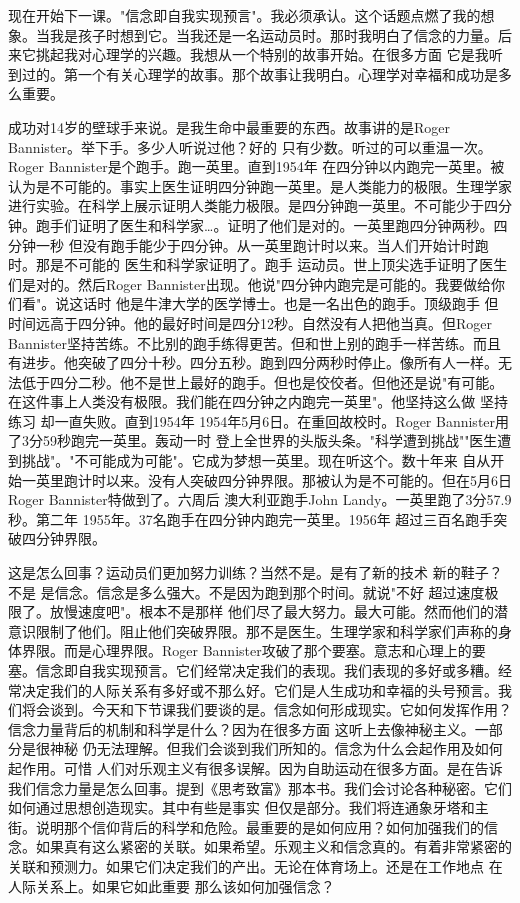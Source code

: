 现在开始下一课。"信念即自我实现预言"。我必须承认。这个话题点燃了我的想象。当我是孩子时想到它。当我还是一名运动员时。那时我明白了信念的力量。后来它挑起我对心理学的兴趣。我想从一个特别的故事开始。在很多方面 它是我听到过的。第一个有关心理学的故事。那个故事让我明白。心理学对幸福和成功是多么重要。 

成功对14岁的壁球手来说。是我生命中最重要的东西。故事讲的是Roger Bannister。举下手。多少人听说过他？好的 只有少数。听过的可以重温一次。Roger Bannister是个跑手。跑一英里。直到1954年 在四分钟以内跑完一英里。被认为是不可能的。事实上医生证明四分钟跑一英里。是人类能力的极限。生理学家进行实验。在科学上展示证明人类能力极限。是四分钟跑一英里。不可能少于四分钟。跑手们证明了医生和科学家…。证明了他们是对的。一英里跑四分钟两秒。四分钟一秒 但没有跑手能少于四分钟。从一英里跑计时以来。当人们开始计时跑时。那是不可能的 医生和科学家证明了。跑手 运动员。世上顶尖选手证明了医生们是对的。然后Roger Bannister出现。他说"四分钟内跑完是可能的。我要做给你们看"。说这话时 他是牛津大学的医学博士。也是一名出色的跑手。顶级跑手 但时间远高于四分钟。他的最好时间是四分12秒。自然没有人把他当真。但Roger Bannister坚持苦练。不比别的跑手练得更苦。但和世上别的跑手一样苦练。而且有进步。他突破了四分十秒。四分五秒。跑到四分两秒时停止。像所有人一样。无法低于四分二秒。他不是世上最好的跑手。但也是佼佼者。但他还是说"有可能。在这件事上人类没有极限。我们能在四分钟之内跑完一英里"。他坚持这么做 坚持练习 却一直失败。直到1954年 1954年5月6日。在重回故校时。Roger Bannister用了3分59秒跑完一英里。轰动一时 登上全世界的头版头条。"科学遭到挑战""医生遭到挑战"。"不可能成为可能"。它成为梦想一英里。现在听这个。数十年来 自从开始一英里跑计时以来。没有人突破四分钟界限。那被认为是不可能的。但在5月6日 Roger Bannister特做到了。六周后 澳大利亚跑手John Landy。一英里跑了3分57.9秒。第二年 1955年。37名跑手在四分钟内跑完一英里。1956年 超过三百名跑手突破四分钟界限。 

这是怎么回事？运动员们更加努力训练？当然不是。是有了新的技术 新的鞋子？不是 是信念。信念是多么强大。不是因为跑到那个时间。就说"不好 超过速度极限了。放慢速度吧"。根本不是那样 他们尽了最大努力。最大可能。然而他们的潜意识限制了他们。阻止他们突破界限。那不是医生。生理学家和科学家们声称的身体界限。而是心理界限。Roger Bannister攻破了那个要塞。意志和心理上的要塞。信念即自我实现预言。它们经常决定我们的表现。我们表现的多好或多糟。经常决定我们的人际关系有多好或不那么好。它们是人生成功和幸福的头号预言。我们将会谈到。今天和下节课我们要谈的是。信念如何形成现实。它如何发挥作用？信念力量背后的机制和科学是什么？因为在很多方面 这听上去像神秘主义。一部分是很神秘 仍无法理解。但我们会谈到我们所知的。信念为什么会起作用及如何起作用。可惜 人们对乐观主义有很多误解。因为自助运动在很多方面。是在告诉我们信念力量是怎么回事。提到《思考致富》那本书。我们会讨论各种秘密。它们如何通过思想创造现实。其中有些是事实 但仅是部分。我们将连通象牙塔和主街。说明那个信仰背后的科学和危险。最重要的是如何应用？如何加强我们的信念。如果真有这么紧密的关联。如果希望。乐观主义和信念真的。有着非常紧密的关联和预测力。如果它们决定我们的产出。无论在体育场上。还是在工作地点 在人际关系上。如果它如此重要 那么该如何加强信念？ 

